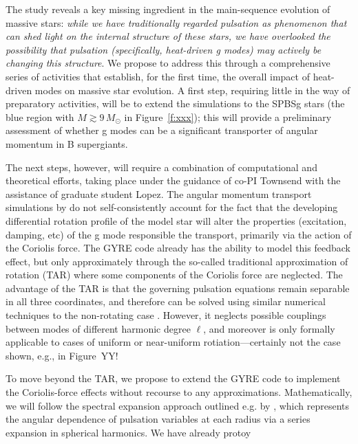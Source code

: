 The \citet{Townsend:2017} study reveals a key missing ingredient in the main-sequence evolution of massive stars: \emph{while we have traditionally regarded pulsation as phenomenon that can shed light on the internal structure of these stars, we have overlooked the possibility that pulsation (specifically, heat-driven g modes) may actively be changing this structure}. We propose to address this through a comprehensive series of activities that establish, for the first time, the overall impact of heat-driven modes on massive star evolution. A first step, requiring little in the way of preparatory activities, will be to extend the \citet{Townsend:2017} simulations to the SPBSg stars (the blue region with $M \gtrsim 9\,M_{\odot}$ in Figure~\ref{f:xxx}); this will provide a preliminary assessment of whether g modes can be a significant transporter of angular momentum in B supergiants.

The next steps, however, will require a combination of computational and theoretical efforts, taking place under the guidance of co-PI Townsend with the assistance of graduate student Lopez. The angular momentum transport simulations by \citet{Townsend:2017} do not self-consistently account for the fact that the developing differential rotation profile of the model star will alter the properties (excitation, damping, etc) of the g mode responsible the transport, primarily via the action of the Coriolis force. The GYRE code already has the ability to model this feedback effect, but only approximately through the so-called traditional approximation of rotation (TAR) where some components of the Coriolis force are neglected. The advantage of the TAR is that the governing pulsation equations remain separable in all three coordinates, and therefore can be solved using similar numerical techniques to the non-rotating case \citep[see, e.g.,][for a demonstration of the TAR applied to rotating SPB stars]{Townsend:2005}. However, it neglects possible couplings between modes of different harmonic degree $\ell$, and moreover is only formally applicable to cases of uniform or near-uniform rotiation---certainly not the case shown, e.g., in Figure~YY!

To move beyond the TAR, we propose to extend the GYRE code to implement the Coriolis-force effects without recourse to any approximations. Mathematically, we will follow the spectral expansion approach outlined e.g. by \citep{Lee:2001}, which represents the angular dependence of pulsation variables at each radius via a series expansion in spherical harmonics. We have already protoy